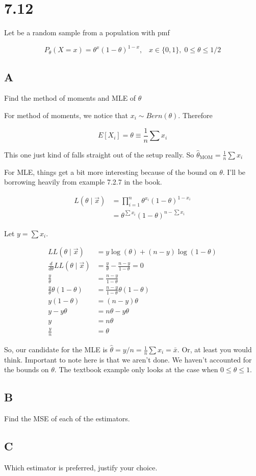 \section{7.12}

Let \rs be a random sample from a population with pmf

\[
	P_{\theta}(X=x) = \theta^x(1-\theta)^{1-x}, \;\;\; x\in\{0,1\}, \; 0 \leq \theta \leq 1/2
\]

\subsection*{A}

Find the method of moments and MLE of $\theta$

For method of moments, we notice that $x_i \sim Bern(\theta)$. Therefore

\[
	E[X_i] = \theta \equiv \frac{1}{n} \sum x_i
\]

This one just kind of falls straight out of the setup really. So $\hat{\theta}_{\text{MOM}} = \frac{1}{n} \sum x_i$

\noindent For MLE, things get a bit more interesting because of the bound on $\theta$. I'll be borrowing heavily from example 7.2.7 in the book. 

\begin{align*}
	L(\theta \mid \vec{x}) &= \prod_{i=1}^n \theta^{x_i} (1-\theta)^{1-x_i} \\
	&= \theta^{\sum x_i} (1-\theta)^{n - \sum x_i}
\end{align*}

Let $y = \sum x_i$.

\begin{align*}
	LL(\theta \mid \vec{x}) &= y\log(\theta) + (n-y) \log(1-\theta) \\
	\frac{d}{d\theta} LL(\theta \mid \vec{x}) &= \frac{y}{\theta} - \frac{n-y}{1-\theta} = 0 \\
	\frac{y}{\theta} &= \frac{n-y}{1-\theta} \\
	\frac{y}{\theta} \theta(1-\theta) &=  \frac{n-y}{1-\theta} \theta(1-\theta) \\
	y(1-\theta) &= (n-y)\theta \\
	y-y\theta &= n\theta - y\theta \\
	y &= n\theta \\
	\frac{y}{n} &= \theta
\end{align*}

So, our candidate for the MLE is $\hat{\theta} = y/n = \frac{1}{n} \sum x_i = \bar{x}$. Or, at least you would think. Important to note here is that we aren't done. We haven't accounted for the bounds on $\theta$. The textbook example only looks at the case when $0 \leq \theta \leq 1$. 

\subsection*{B}

Find the MSE of each of the estimators.

\subsection*{C}

Which estimator is preferred, justify your choice.
